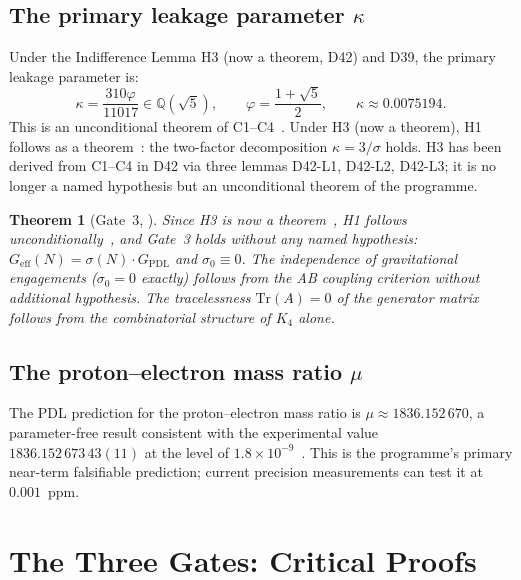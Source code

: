 \documentclass[11pt,a4paper]{article}
\theoremstyle{plain}
\newtheorem{theorem}{Theorem}[section]
\theoremstyle{definition}
\theoremstyle{remark}
\newcommand{\Geff}{G_{\mathrm{eff}}}
\newcommand{\GPDL}{G_{\mathrm{PDL}}}
\newcommand{\sigmaN}{\sigma(N)}
\begin{document}
\subsection{The primary leakage parameter \texorpdfstring{$\kappa$}{kappa}}
\label{subsec:kappa}
Under the Indifference Lemma H3 (now a theorem, D42) and D39, the primary leakage parameter is:
\begin{equation}
\kappa = \frac{310\varphi}{11017} \in \mathbb{Q}(\sqrt{5}), \qquad \varphi = \frac{1+\sqrt{5}}{2}, \qquad \kappa \approx 0.0075194.
\end{equation}
This is an unconditional theorem of C1--C4~\cite{D39,D42}. Under H3 (now a theorem), H1 follows as a theorem~\cite{D39}: the two-factor decomposition $\kappa=3/\sigma$ holds. H3 has been derived from C1--C4 in D42 via three lemmas D42-L1, D42-L2, D42-L3; it is no longer a named hypothesis but an unconditional theorem of the programme.

\begin{theorem}[Gate~3, \cite{D36}]
\label{thm:Gate3}
Since H3 is now a theorem~\cite{D42}, H1 follows unconditionally~\cite{D39}, and Gate~3 holds without any named hypothesis: $\Geff(N)=\sigmaN\cdot\GPDL$ and $\sigma_0\equiv 0$. The independence of gravitational engagements ($\sigma_0=0$ exactly) follows from the AB coupling criterion without additional hypothesis. The tracelessness $\mathrm{Tr}(A)=0$ of the generator matrix follows from the combinatorial structure of $K_4$ alone.
\end{theorem}

\subsection{The proton--electron mass ratio \texorpdfstring{$\mu$}{mu}}
\label{subsec:mu}
The PDL prediction for the proton--electron mass ratio is $\mu\approx 1836.152\,670$, a parameter-free result consistent with the experimental value $1836.152\,673\,43(11)$ at the level of $1.8\times10^{-9}$~\cite{D28,D29,D30}. This is the programme's primary near-term falsifiable prediction; current precision measurements can test it at $0.001$~ppm.

\section{The Three Gates: Critical Proofs}
\label{sec:gates}
\end{document}
